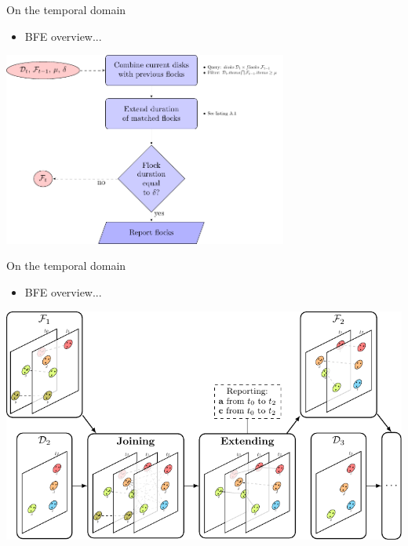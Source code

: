     \begin{frame}{On the temporal domain}
        \begin{itemize} \item BFE overview... \end{itemize} \vspace{0.5cm}

        \centering
        \includegraphics[width=0.7\textwidth]{../thesis/chapterPFlocks/figures/FF_flowchart}
    \end{frame}

    \begin{frame}{On the temporal domain}
        \begin{itemize} \item BFE overview... \end{itemize} \vspace{0.5cm}

        \centering
        \includegraphics[width=\textwidth]{../thesis/chapterPFlocks/figures/Temporal/f_stages}
    \end{frame}

